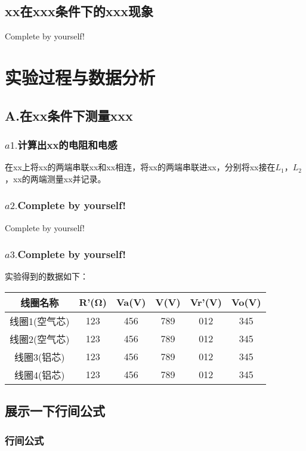 \documentclass[UTF8]{ctexart}
\begin{document}
\subsection{xx在xxx条件下的xxx现象}
Complete by yourself!


\section{实验过程与数据分析}
\subsection{A.在xx条件下测量xxx}
\subsubsection{$a1. $计算出xx的电阻和电感}
在xx上将xx的两端串联xx和xx相连，将xx的两端串联进xx，分别将xx接在$L_1$，$L_2$，xx的两端测量xx并记录。
\subsubsection{$a2. $Complete by yourself!}
Complete by yourself!
\subsubsection{$a3. $Complete by yourself!}
实验得到的数据如下：

\begin{center}
\begin{tabular}{|c|c|c|c|c|c|}
 \hline
线圈名称 & R'(Ω) & Va(V) & V(V) & Vr'(V) & Vo(V)\\
 \hline
线圈1(空气芯) & 123 & 456 & 789 & 012 & 345\\
 \hline
线圈2(空气芯) & 123 & 456 & 789 & 012 & 345\\
 \hline
线圈3(铝芯) & 123 & 456 & 789 & 012 & 345\\
 \hline
线圈4(铝芯) & 123 & 456 & 789 & 012 & 345\\
 \hline
\end{tabular}
\end{center}

\subsection{展示一下行间公式}
\subsubsection{行间公式}
\end{document}
